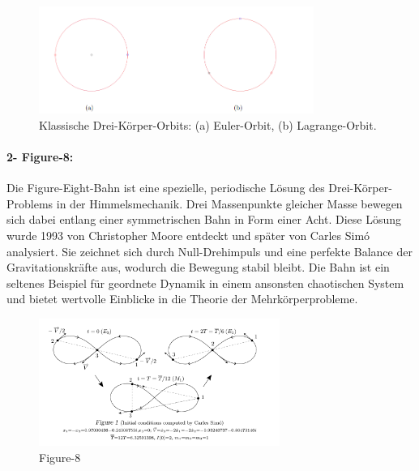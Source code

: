 \documentclass[a4paper,12pt,twoside]{article}
\begin{document}
\begin{figure}[H]
	\centering
	\includegraphics[width=0.8\textwidth]{EulerUndLagrange.png}
	\caption[Eintrag in Abbildungsverzeichnis von Euler und Lagrange Orbit]{Klassische Drei-Körper-Orbits: (a) Euler-Orbit, (b) Lagrange-Orbit.}
	\label{EulerUndLagrange}
\end{figure}

\paragraph{2- Figure-8:}
Die Figure-Eight-Bahn ist eine spezielle, periodische Lösung des 
Drei-Körper-Problems in der Himmelsmechanik. 
Drei Massenpunkte gleicher Masse bewegen sich dabei entlang 
einer symmetrischen Bahn in Form einer Acht. 
Diese Lösung wurde 1993 von Christopher Moore entdeckt und 
später von Carles Simó analysiert. 
Sie zeichnet sich durch Null-Drehimpuls und 
eine perfekte Balance der Gravitationskräfte aus, 
wodurch die Bewegung stabil bleibt. Die Bahn ist ein seltenes 
Beispiel für geordnete Dynamik in einem ansonsten chaotischen System und 
bietet wertvolle Einblicke in die Theorie der Mehrkörperprobleme.
\begin{figure}[H]
    \centering
    \includegraphics[width=0.7\textwidth]{figure8.png}
    \caption[Eintrag in Abbildungsverzeichnis von Figure-8]{Figure-8}
    \label{figure8}
\end{figure}
\end{document}
